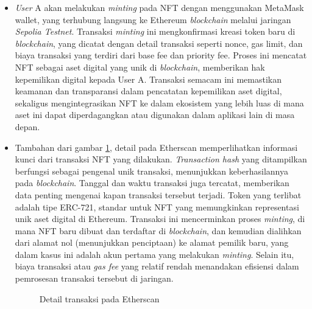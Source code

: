 \begin{itemize}
    \item \emph{User} A akan melakukan \emph{minting} pada NFT dengan menggunakan MetaMask wallet, yang terhubung langsung ke Ethereum \emph{blockchain} melalui jaringan \emph{Sepolia Testnet}. Transaksi \emph{minting} ini mengkonfirmasi kreasi token baru di \emph{blockchain}, yang dicatat dengan detail transaksi seperti nonce, gas limit, dan biaya transaksi yang terdiri dari base fee dan priority fee. Proses ini mencatat NFT sebagai aset digital yang unik di \emph{blockchain}, memberikan hak kepemilikan digital kepada User A. Transaksi semacam ini memastikan keamanan dan transparansi dalam pencatatan kepemilikan aset digital, sekaligus mengintegrasikan NFT ke dalam ekosistem yang lebih luas di mana aset ini dapat diperdagangkan atau digunakan dalam aplikasi lain di masa depan.


    \item Tambahan dari gambar \ref*{fig:detail_transaksi_etherscan}, detail pada Etherscan memperlihatkan informasi kunci dari transaksi NFT yang dilakukan. \emph{Transaction hash} yang ditampilkan berfungsi sebagai pengenal unik transaksi, menunjukkan keberhasilannya pada \emph{blockchain}. Tanggal dan waktu transaksi juga tercatat, memberikan data penting mengenai kapan transaksi tersebut terjadi. Token yang terlibat adalah tipe ERC-721, standar untuk NFT yang memungkinkan representasi unik aset digital di Ethereum. Transaksi ini mencerminkan proses \emph{minting}, di mana NFT baru dibuat dan terdaftar di \emph{blockchain}, dan kemudian dialihkan dari alamat nol (menunjukkan penciptaan) ke alamat pemilik baru, yang dalam kasus ini adalah akun pertama yang melakukan \emph{minting}. Selain itu, biaya transaksi atau \emph{gas fee} yang relatif rendah menandakan efisiensi dalam pemrosesan transaksi tersebut di jaringan.

    \begin{figure} [H] \centering
    \caption{Detail transaksi pada Etherscan}
    \label{fig:detail_transaksi_etherscan}
    \end{figure}


\end{itemize}
